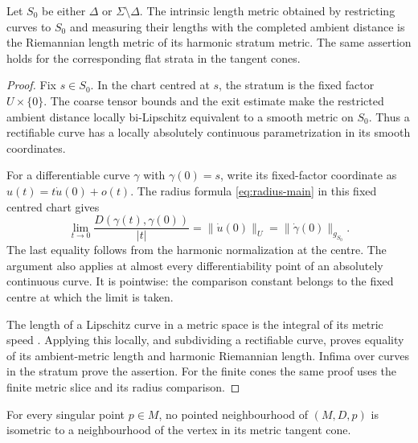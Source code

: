 \begin{lemma}\label{lem:stratum-length}
Let $S_0$ be either $\Delta$ or
$\Sigma\setminus\Delta$. The intrinsic length
metric obtained by restricting curves to $S_0$
and measuring their lengths with the completed
ambient distance is the Riemannian length metric
of its harmonic stratum metric. The same assertion
holds for the corresponding flat strata in the
tangent cones.
\end{lemma}

\begin{proof}
Fix $s\in S_0$. In the chart centred at $s$, the
stratum is the fixed factor $U\times\{0\}$.
The coarse tensor bounds and the exit estimate
make the restricted ambient distance locally
bi-Lipschitz equivalent to a smooth metric on
$S_0$. Thus a rectifiable curve has a locally
absolutely continuous parametrization in its
smooth coordinates.

For a differentiable curve $\gamma$ with
$\gamma(0)=s$, write its fixed-factor coordinate
as $u(t)=t\dot u(0)+o(t)$. The radius formula
\eqref{eq:radius-main} in this fixed centred
chart gives
\begin{equation}\label{eq:metric-speed}
 \lim_{t\to0}\frac{D(\gamma(t),\gamma(0))}{|t|}
       =\|\dot u(0)\|_U
       =\|\dot\gamma(0)\|_{g_{S_0}}.
\end{equation}
The last equality follows from the harmonic
normalization at the centre. The argument also
applies at almost every differentiability point
of an absolutely continuous curve. It is
pointwise: the comparison constant belongs to
the fixed centre at which the limit is taken.

The length of a Lipschitz curve in a metric
space is the integral of its metric speed
\cite[Theorem~2.7.6]{bbi01}. Applying this
locally, and subdividing a rectifiable curve,
proves equality of its ambient-metric length
and harmonic Riemannian length. Infima over
curves in the stratum prove the assertion.
For the finite cones the same proof uses the
finite metric slice and its radius comparison.
\end{proof}

\begin{proposition}\label{prop:not-isometric}
For every singular point $p\in M$, no pointed
neighbourhood of $(M,D,p)$ is isometric to a
neighbourhood of the vertex in its metric
tangent cone.
\end{proposition}

